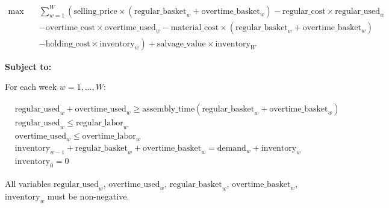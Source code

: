 \documentclass{article}
\begin{document}
\[
\begin{aligned}
\text{max} \quad & \sum_{w=1}^{W} \left( \text{selling\_price} \times (\text{regular\_basket}_w + \text{overtime\_basket}_w) - \text{regular\_cost} \times \text{regular\_used}_w \right. \\
& \left. - \text{overtime\_cost} \times \text{overtime\_used}_w - \text{material\_cost} \times (\text{regular\_basket}_w + \text{overtime\_basket}_w) \right. \\
& \left. - \text{holding\_cost} \times \text{inventory}_{w} \right) + \text{salvage\_value} \times \text{inventory}_{W}
\end{aligned}
\]

\textbf{Subject to:}

For each week $w = 1, \ldots, W$:

\begin{align*}
& \text{regular\_used}_{w} + \text{overtime\_used}_{w} \geq \text{assembly\_time} (\text{regular\_basket}_{w} + \text{overtime\_basket}_{w}) \\
& \text{regular\_used}_{w} \leq \text{regular\_labor}_{w} \\
& \text{overtime\_used}_{w} \leq \text{overtime\_labor}_{w} \\
& \text{inventory}_{w-1} + \text{regular\_basket}_{w} + \text{overtime\_basket}_{w} = \text{demand}_{w} + \text{inventory}_{w} \\
& \text{inventory}_{0} = 0
\end{align*}

All variables $\text{regular\_used}_{w}$, $\text{overtime\_used}_{w}$, $\text{regular\_basket}_{w}$, $\text{overtime\_basket}_{w}$, $\text{inventory}_{w}$ must be non-negative.
\end{document}
